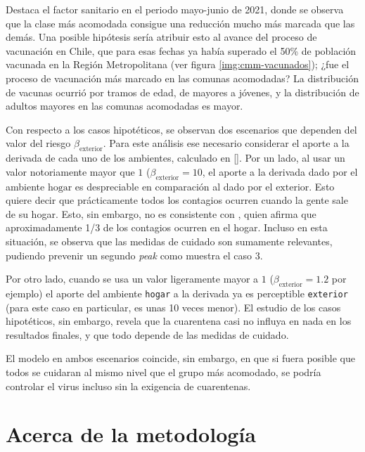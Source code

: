 Destaca el factor sanitario en el periodo mayo-junio de 2021, donde se observa que la clase más acomodada consigue una reducción mucho más marcada que las demás. Una posible hipótesis sería atribuir esto al avance del proceso de vacunación en Chile, que para esas fechas ya había superado el 50\% de población vacunada en la Región Metropolitana (ver figura \ref{img:cmm-vacunados}); ¿fue el proceso de vacunación más marcado en las comunas acomodadas? La distribución de vacunas ocurrió por tramos de edad, de mayores a jóvenes, y la distribución de adultos mayores en las comunas acomodadas es mayor.

Con respecto a los casos hipotéticos, se observan dos escenarios que dependen del valor del riesgo \(\beta_{\text{exterior}}\). Para este análisis ese necesario considerar el aporte a la derivada de cada uno de los ambientes, calculado en \ref{}. 
Por un lado, al usar un valor notoriamente mayor que \(1\) (\(\beta_{\text{exterior}} = 10\), el aporte a la derivada dado por el ambiente \(\text{hogar}\) es despreciable en comparación al dado por el \(\text{exterior}\). Esto quiere decir que prácticamente todos los contagios ocurren cuando la gente sale de su hogar. Esto, sin embargo, no es consistente con \cite{Ferguson2020}, quien afirma que aproximadamente 1/3 de los contagios ocurren en el hogar. Incluso en esta situación, se observa que las medidas de cuidado son sumamente relevantes, pudiendo prevenir un segundo \textit{peak} como muestra el caso 3.

Por otro lado, cuando se usa un valor ligeramente mayor a \(1\) (\(\beta_{\text{exterior}} = 1.2\) por ejemplo) el aporte del ambiente \texttt{hogar} a la derivada ya es perceptible \texttt{exterior} (para este caso en particular, es unas 10 veces menor). El estudio de los casos hipotéticos, sin embargo, revela que la cuarentena casi no influya en nada en los resultados finales, y que todo depende de las medidas de cuidado.

El modelo en ambos escenarios coincide, sin embargo, en que si fuera posible que todos se cuidaran al mismo nivel que el grupo más acomodado, se podría controlar el virus incluso sin la exigencia de cuarentenas.

\section{Acerca de la metodología}\label{dis:metod}

  


